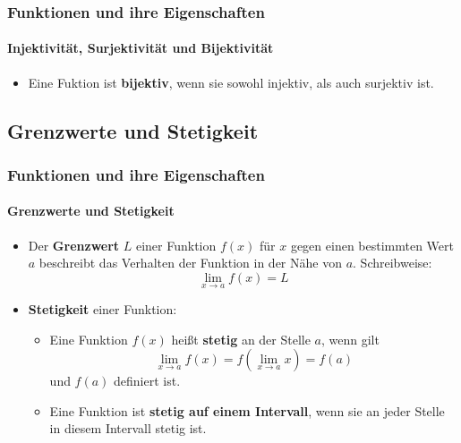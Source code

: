 \documentclass{beamer}
\begin{document}
\begin{frame}
    \frametitle{Funktionen und ihre Eigenschaften}
    \framesubtitle{Injektivität, Surjektivität und Bijektivität}
    \begin{itemize}
        \item Eine Fuktion ist \textbf{bijektiv}, wenn sie sowohl injektiv, als auch surjektiv ist.
    \end{itemize}
\end{frame}

\subsection{Grenzwerte und Stetigkeit}
\begin{frame}
  \frametitle{Funktionen und ihre Eigenschaften}
  \framesubtitle{Grenzwerte und Stetigkeit}

  \begin{itemize}
    \item Der \textbf{Grenzwert} $L$ einer Funktion $f(x)$ für $x$ gegen einen bestimmten Wert $a$ beschreibt das Verhalten der Funktion in der Nähe von $a$.
    Schreibweise: $$\lim_{x \to a} f(x) = L$$
    \item \textbf{Stetigkeit} einer Funktion:
      \begin{itemize}
        \item Eine Funktion $f(x)$ heißt \textbf{stetig} an der Stelle $a$, wenn gilt $$\lim_{x \to a} f(x) = f (\lim_{x \to a} x) = f(a) $$  und $f(a)$ definiert ist.
        \item Eine Funktion ist \textbf{stetig auf einem Intervall}, wenn sie an jeder Stelle in diesem Intervall stetig ist.
      \end{itemize}
  \end{itemize}
\end{frame}
\end{document}
